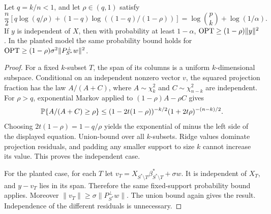 \begin{lemma}\label{regression:opt-lower}
Let $q=k/n<1$, and let $\rho\in(q,1)$ satisfy
\[
 \frac n2\left[q\log(q/\rho)+(1-q)\log((1-q)/(1-\rho))\right]
       =\log\binom pk+\log(1/\alpha).
\]
If $y$ is independent of $X$, then with probability at least
$1-\alpha$, $\operatorname{OPT}\geq(1-\rho)\|y\|^2$.
In the planted model the same probability bound holds for
$\operatorname{OPT}\geq(1-\rho)\sigma^2\|P_{S^*}^\perp w\|^2$.
\end{lemma}
\begin{proof}
For a fixed $k$-subset $T$, the span of its columns is a uniform
$k$-dimensional subspace. Conditional on an independent nonzero
vector $v$, the squared projection fraction has the law
$A/(A+C)$, where $A\sim\chi_k^2$ and $C\sim\chi_{n-k}^2$ are
independent. For $\rho>q$, exponential Markov applied to
$(1-\rho)A-\rho C$ gives
\[
 \mathbb{P}\{A/(A+C)\geq\rho\}\leq
 (1-2t(1-\rho))^{-k/2}(1+2t\rho)^{-(n-k)/2}.
\]
Choosing $2t(1-\rho)=1-q/\rho$ yields the exponential of minus
the left side of the displayed equation. Union-bound over all
$k$-subsets. Ridge values dominate projection residuals, and
padding any smaller support to size $k$ cannot increase its
value. This proves the independent case.

For the planted case, for each $T$ let
$v_T=X_{S^*\setminus T}\beta_{S^*\setminus T}^*+\sigma w$.
It is independent of $X_T$, and $y-v_T$ lies in its span.
Therefore the same fixed-support probability bound applies.
Moreover $\|v_T\|\geq\sigma\|P_{S^*}^\perp w\|$.
The union bound again gives the result. Independence of the
different residuals is unnecessary.
\end{proof}

